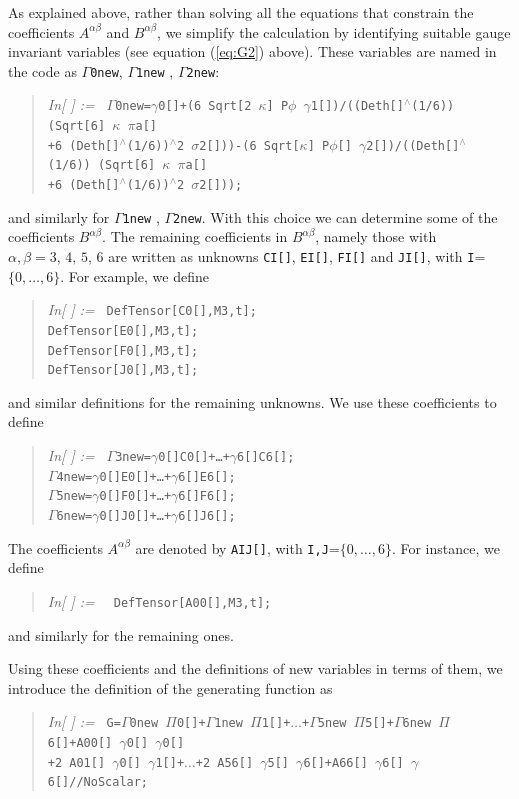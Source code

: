 \documentclass[11pt,tightenlines,eqsecnum,floats,aps,amsmath,amssymb,nofootinbib,prd,floatfix]{revtex4}
\newcommand{\<}{\langle}
\renewcommand{\>}{\rangle}
\newcounter{inout}
\newcommand{\inoutput}{%
	\stepcounter{inout}%
	\theinout}
\newcommand{\mathIn}[1]{
	\begin{quotation}\hspace*{-2.5cm} {\em In[\inoutput] :=\ } {\tt #1} \end{quotation}}
\begin{document}
As explained above, rather than solving all the equations that constrain the coefficients $A^{\alpha\beta}$ and $B^{\alpha\beta}$, %
we simplify the calculation by identifying suitable gauge invariant  variables (see equation (\ref{eq:G2}) above). 
These variables are named in the code as {\tt $\Gamma$0new}, {\tt $\Gamma$1new} , {\tt $\Gamma$2new}: 
%
\mathIn{$\Gamma$0new=$\gamma$0[]+(6\,Sqrt[2\,$\kappa$]\,P$\phi$\,$\gamma$1[])/((Deth[]$^{\wedge}$(1/6))\,(Sqrt[6]\,$\kappa$\,$\pi$a[]\\+6\,(Deth[]$^{\wedge}$(1/6))$^{\wedge}$2\,$\sigma$2[]))-(6\,Sqrt[$\kappa$]\,P$\phi$[]\,$\gamma$2[])/((Deth[]$^{\wedge}$(1/6))\,(Sqrt[6]\,$\kappa$\,$\pi$a[]\\
+6\,(Deth[]$^{\wedge}$(1/6))$^{\wedge}$2\,$\sigma$2[]));}
%
and similarly for {\tt $\Gamma$1new} , {\tt $\Gamma$2new}. With this choice we can determine some of the coefficients $B^{\alpha\beta}$. The remaining coefficients in $B^{\alpha\beta}$, namely those with $\alpha,\beta = 3,\,4,\,5,\,6$ are written as unknowns {\tt CI[]}, {\tt EI[]}, {\tt FI[]} and {\tt JI[]}, with {\tt I}=$\{0,\ldots,6\}$. For example, we define
%
\mathIn{DefTensor[C0[],{M3,t}];\\
DefTensor[E0[],{M3,t}];\\
DefTensor[F0[],{M3,t}];\\
DefTensor[J0[],{M3,t}];}
%
and similar definitions for the remaining unknowns. We use these coefficients to define
%
\mathIn{$\Gamma$3new=$\gamma$0[]C0[]+\ldots+$\gamma$6[]C6[];\\
$\Gamma$4new=$\gamma$0[]E0[]+\ldots+$\gamma$6[]E6[];\\
$\Gamma$5new=$\gamma$0[]F0[]+\ldots+$\gamma$6[]F6[];\\
$\Gamma$6new=$\gamma$0[]J0[]+\ldots+$\gamma$6[]J6[];
}
The coefficients $A^{\alpha\beta}$ are denoted by {\tt AIJ[]}, with {\tt I,J}=$\{0,\ldots,6\}$. For instance, we define
%
\mathIn{
DefTensor[A00[],{M3,t}];}
%
and similarly for the remaining ones.

Using these coefficients and the definitions of new variables in terms of them, we introduce the definition of the generating function as
%
\mathIn{G=$\Gamma$0new\,$\Pi$0[]+$\Gamma$1new\,$\Pi$1[]+$\ldots$+$\Gamma$5new\,$\Pi$5[]+$\Gamma$6new\,$\Pi$6[]+A00[]\,$\gamma$0[]\,$\gamma$0[]\\
+2\,A01[]\,$\gamma$0[]\,$\gamma$1[]+$\ldots$+2\,A56[]\,$\gamma$5[]\,$\gamma$6[]+A66[]\,$\gamma$6[]\,$\gamma$6[]//NoScalar;}
%
\end{document}
